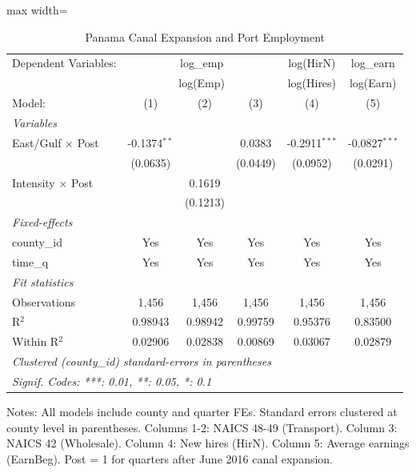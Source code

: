 
\begin{table}[htbp]
   \caption{\label{tab:main} Panama Canal Expansion and Port Employment}
   \centering
   \begin{adjustbox}{max width=\textwidth}
   \begin{tabular}{lccccc}
      \tabularnewline \midrule \midrule
      Dependent Variables: & \multicolumn{3}{c}{log\_emp} & log(HirN) & log\_earn\\
       & \multicolumn{3}{c}{log(Emp)} & log(Hires) & log(Earn) \\ 
      Model:                   & (1)            & (2)      & (3)      & (4)             & (5)\\  
      \midrule
      \emph{Variables}\\
      East/Gulf $\times$ Post  & -0.1374$^{**}$ &          & 0.0383   & -0.2911$^{***}$ & -0.0827$^{***}$\\   
                               & (0.0635)       &          & (0.0449) & (0.0952)        & (0.0291)\\   
      Intensity $\times$ Post  &                & 0.1619   &          &                 &   \\   
                               &                & (0.1213) &          &                 &   \\   
      \midrule
      \emph{Fixed-effects}\\
      county\_id               & Yes            & Yes      & Yes      & Yes             & Yes\\  
      time\_q                  & Yes            & Yes      & Yes      & Yes             & Yes\\  
      \midrule
      \emph{Fit statistics}\\
      Observations             & 1,456          & 1,456    & 1,456    & 1,456           & 1,456\\  
      R$^2$                    & 0.98943        & 0.98942  & 0.99759  & 0.95376         & 0.83500\\  
      Within R$^2$             & 0.02906        & 0.02838  & 0.00869  & 0.03067         & 0.02879\\  
      \midrule \midrule
      \multicolumn{6}{l}{\emph{Clustered (county\_id) standard-errors in parentheses}}\\
      \multicolumn{6}{l}{\emph{Signif. Codes: ***: 0.01, **: 0.05, *: 0.1}}\\
   \end{tabular}
   \end{adjustbox}

   \par \raggedright 
   Notes: All models include county and quarter FEs. Standard errors clustered at county level in parentheses. Columns 1-2: NAICS 48-49 (Transport). Column 3: NAICS 42 (Wholesale). Column 4: New hires (HirN). Column 5: Average earnings (EarnBeg). Post = 1 for quarters after June 2016 canal expansion.
\end{table}



